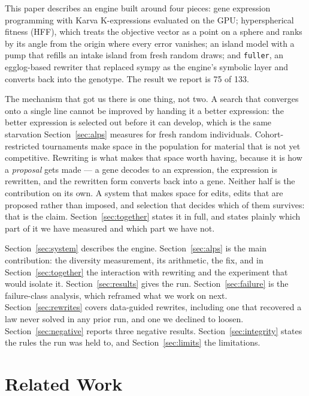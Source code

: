 \documentclass[11pt,a4paper]{article}
\begin{document}
This paper describes an engine built around four pieces: gene expression
programming with Karva K-expressions evaluated on the GPU; hyperspherical
fitness (HFF), which treats the objective vector as a point on a sphere and
ranks by its angle from the origin where every error vanishes; an island model
with a pump that refills an intake island from fresh random draws; and
\texttt{fuller}, an egglog-based rewriter that replaced sympy as the engine's
symbolic layer and converts back into the genotype. The result we report is 75
of 133.

The mechanism that got us there is one thing, not two. A search that converges
onto a single line cannot be improved by handing it a better expression: the
better expression is selected out before it can develop, which is the same
starvation Section~\ref{sec:alps} measures for fresh random individuals.
Cohort-restricted tournaments make space in the population for material that is
not yet competitive. Rewriting is what makes that space worth having, because it
is how a \emph{proposal} gets made --- a gene decodes to an expression, the
expression is rewritten, and the rewritten form converts back into a gene.
Neither half is the contribution on its own. A system that makes space for
edits, edits that are proposed rather than imposed, and selection that decides
which of them survives: that is the claim. Section~\ref{sec:together} states it
in full, and states plainly which part of it we have measured and which part we
have not.

Section~\ref{sec:system} describes the engine. Section~\ref{sec:alps} is the
main contribution: the diversity measurement, its arithmetic, the fix, and in
Section~\ref{sec:together} the interaction with rewriting and the experiment
that would isolate it. Section~\ref{sec:results} gives the run. Section~\ref{sec:failure} is the
failure-class analysis, which reframed what we work on next.
Section~\ref{sec:rewrites} covers data-guided rewrites, including one that
recovered a law never solved in any prior run, and one we declined to loosen.
Section~\ref{sec:negative} reports three negative results.
Section~\ref{sec:integrity} states the rules the run was held to, and
Section~\ref{sec:limits} the limitations.

\section{Related Work}
\label{sec:related}

\end{document}
